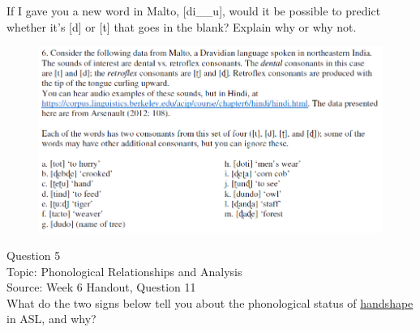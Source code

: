 \documentclass[12pt]{article}
\begin{document}
If I gave you a new word in Malto, [di\_\_u], would it be possible to predict whether it's [d] or [t] that goes in the blank? Explain why or why not.\\

\begin{figure}[H]
\includegraphics{../images/malto.png}
\end{figure}

\newpage

{\large Question 5}\\

Topic: Phonological Relationships and Analysis\\
Source: Week 6 Handout, Question 11\\

What do the two signs below tell you about the phonological status of \underline{handshape} in ASL, and why?\\
\end{document}
